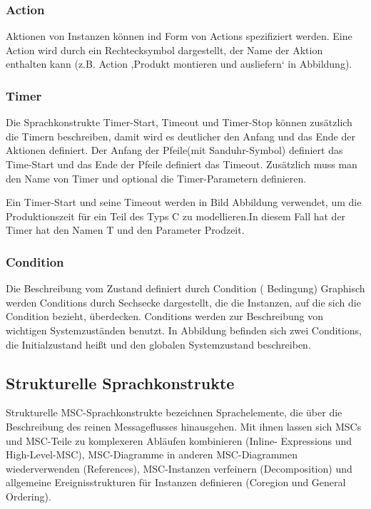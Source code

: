 \subsubsection{Action}

Aktionen von Instanzen können ind Form von Actions spezifiziert werden.
Eine Action wird durch ein Rechtecksymbol dargestellt, der Name der Aktion enthalten kann (z.B. Action ,Produkt
montieren und ausliefern‘ in Abbildung).
\\
\subsubsection{Timer}
Die Sprachkonstrukte Timer-Start, Timeout und Timer-Stop können zusätzlich die Timern beschreiben, damit wird es deutlicher den Anfang und das Ende der Aktionen definiert.
Der Anfang der Pfeile(mit Sanduhr-Symbol) definiert das Time-Start und das Ende der Pfeile definiert das Timeout. Zusätzlich muss man den Name von Timer und optional die Timer-Parametern definieren.

Ein Timer-Start und seine Timeout werden
in Bild Abbildung verwendet, um die Produktionszeit für ein Teil des
Typs C zu modellieren.In diesem Fall hat der Timer hat den Namen T und
den Parameter Prodzeit.\\
\subsubsection{Condition}
Die Beschreibung vom Zustand definiert durch Condition ( Bedingung)
Graphisch werden Conditions durch Sechsecke dargestellt,
die die Instanzen, auf die sich die Condition bezieht,
überdecken. Conditions werden zur Beschreibung von
wichtigen Systemzuständen benutzt. In Abbildung befinden sich
zwei Conditions, die Initialzustand heißt und den globalen Systemzustand beschreiben.\\


\subsection{Strukturelle Sprachkonstrukte}
Strukturelle MSC-Sprachkonstrukte bezeichnen Sprachelemente,
die über die Beschreibung des reinen Messageflusses
hinausgehen. Mit ihnen lassen sich MSCs und
MSC-Teile zu komplexeren Abläufen kombinieren (Inline-
Expressions und High-Level-MSC), MSC-Diagramme in
anderen MSC-Diagrammen wiederverwenden (References),
MSC-Instanzen verfeinern (Decomposition) und allgemeine
Ereignisstrukturen für Instanzen definieren (Coregion und
General Ordering).\cite{MT009}\\


